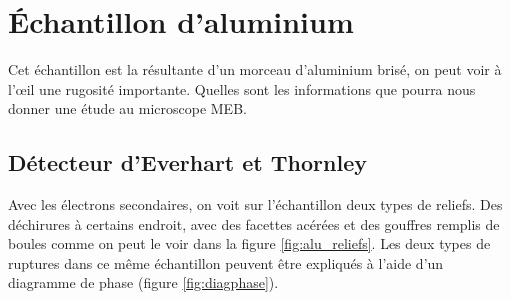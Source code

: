 \documentclass[a4paper,12pt]{article}
\newcommand\ett{Everhart et Thornley\xspace}
\begin{document}
\section{Échantillon d'aluminium}


Cet échantillon est la résultante d'un morceau d'aluminium brisé, on peut voir à l'œil une rugosité importante. Quelles sont les informations que pourra nous donner une étude au microscope MEB.

\subsection{Détecteur d'\ett}
Avec les électrons secondaires, on voit sur l'échantillon deux types de reliefs. Des déchirures à certains endroit, avec des facettes acérées et des gouffres remplis de boules comme on peut le voir dans la figure \ref{fig:alu_reliefs}. Les deux types de ruptures dans ce même échantillon peuvent être expliqués à l'aide d'un diagramme de phase (figure \ref{fig:diagphase}).
\end{document}
